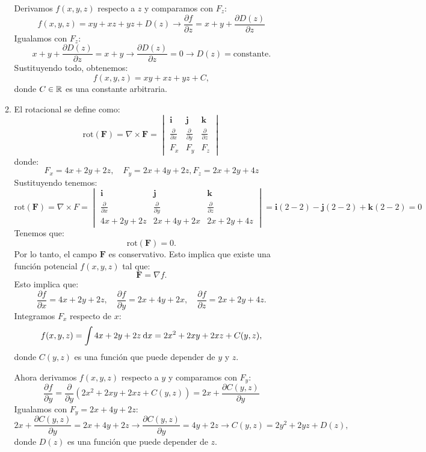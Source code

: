 \begin{enumerate}[label=\color{red}\textbf{\arabic*)}]
\begin{enumerate}[label=\color{red}\textbf{\alph*)}]
Derivamos  $f(x,y,z)$ respecto a  $z$ y comparamos con  $F_z$:  \[
f(x,y,z)=xy+xz+yz+D(z) \longrightarrow \frac{\partial f}{\partial z} =x+y+\frac{\partial D(z)}{\partial z} 
\] 
Igualamos con $F_z$:  \[
x+y+\frac{\partial D(z)}{\partial z} =x+y\longrightarrow \frac{\partial D(z)}{\partial z} =0 \longrightarrow D(z)=\text{constante}.
\]
Sustituyendo todo, obtenemos: \[
f(x,y,z)=xy+xz+yz+C,
\] donde $C\in \operatorname{\mathbb{R}}$ es una constante arbitraria.

    \item {} 
  
      El rotacional se define como: \[
      \mathrm{rot} (\mathbf{F} )=\nabla \times \mathbf{F} =\begin{vmatrix} 
        \mathbf{i}  & \mathbf{j} & \mathbf{k} \\
        \frac{\partial }{\partial x}  & \frac{\partial }{\partial y} & \frac{\partial }{\partial z} \\
        F_x & F_y & F_z
      \end{vmatrix} 
      \] donde: \[
      F_x=4x+2y+2z,\quad F_y=2x+4y+2z, F_z=2x+2y+4z
      \] 
      Sustituyendo tenemos: \[
      \mathrm{rot} (\mathbf{F} )=\nabla \times F=\begin{vmatrix} 
        \mathbf{i} & \mathbf{j} & \mathbf{k} \\ 
        \frac{\partial }{\partial x} & \frac{\partial }{\partial y} & \frac{\partial }{\partial z} \\
        4x+2y+2z & 2x+4y+2x & 2x+2y+4z
      \end{vmatrix} = \mathbf{i} (2-2) -\mathbf{j} (2-2)+\mathbf{k} (2-2)=0
      \] 
      Tenemos que: \[
     \mathrm{rot} (\mathbf{F})=0.
      \] 
      Por lo tanto, el campo $\mathbf{F} $ es conservativo. Esto implica que existe una función potencial $f(x,y,z)$ tal que:  \[
      \mathbf{F} =\nabla f.
      \] 
      Esto implica que: \[
      \frac{\partial f}{\partial x} =4x+2y+2z,\quad \frac{\partial f}{\partial y} =2x+4y+2x,\quad \frac{\partial f}{\partial z} =2x+2y+4z.
      \] 
      Integramos $F_x$ respecto de $x$:  \[
      f(x,y,z)=\int 4x+2y+2z\:\mathrm{d}x =2x^2+2xy+2xz+C(y,z),
      \] 
      donde $C(y,z)$ es una función que puede depender de  $y$ y  $z$.

      Ahora derivamos $f(x,y,z)$ respecto a  $y$ y comparamos con  $F_y$:  \[
      \frac{\partial f}{\partial y} =\frac{\partial }{\partial y} \left( 2x^2+2xy+2xz+C(y,z) \right) = 2x+\frac{\partial C(y,z)}{\partial y} 
      \] 
      Igualamos con $F_y=2x+4y+2z$: \[
      2x+\frac{\partial C(y,z)}{\partial y} =2x+4y+2z\longrightarrow \frac{\partial C(y,z)}{\partial y} =4y+2z\longrightarrow C(y,z) = 2y^2+2yz+D(z),
      \] donde $D(z)$ es una función que puede depender de $z$.


\end{enumerate}
\end{enumerate}
